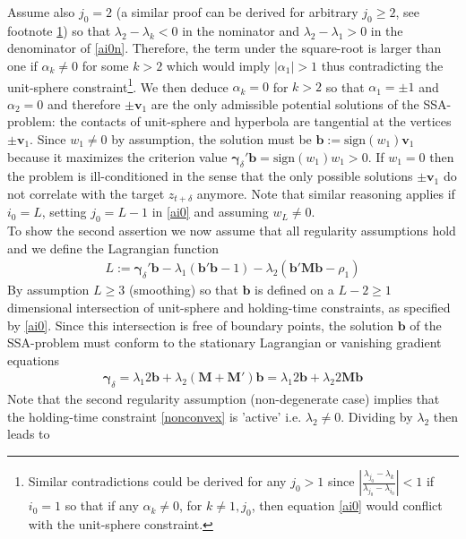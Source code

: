 \documentclass[a4paper]{article}
\begin{document}
Assume also $j_0=2$ (a similar proof can be derived for arbitrary $j_0\geq 2$, see footnote \ref{footnval})
so that $\lambda_{2}-\lambda_k<0$ in the nominator  and $\lambda_{2}-\lambda_{1}>0$ in the denominator of \ref{ai0n}. Therefore, the term under the square-root is larger than one if $\alpha_k\neq 0$ for some $k>2$ which would imply $|\alpha_{1}|>1$ thus contradicting the unit-sphere constraint\footnote{\label{footnval}Similar contradictions could be derived for any $j_0>1$ since $\left|\frac{\lambda_{j_0}-\lambda_k}{\lambda_{j_0}-\lambda_{i_0}}\right|<1$ if $i_0=1$ so that if any $\alpha_k\neq 0$, for $k\neq 1,j_0$, then equation \ref{ai0} would conflict with the unit-sphere constraint.}. We then deduce $\alpha_k=0$ for $k>2$ so that $\alpha_{1}=\pm 1$ and  $\alpha_{2}=0$ and therefore $\pm \mathbf{v}_1$ are the only admissible potential solutions of the SSA-problem: the contacts of unit-sphere and hyperbola are tangential at the vertices $\pm\mathbf{v}_1$. Since $w_1\neq 0$ by assumption, the solution must be $\mathbf{b}:=\textrm{sign}(w_1)\mathbf{v}_1$ because it maximizes the criterion value $\boldsymbol{\gamma}_{\delta}'\mathbf{b}=\textrm{sign}(w_1)w_1>0$. 
If $w_1=0$ then the problem is ill-conditioned in the sense that the only possible solutions $\pm \mathbf{v}_1$ do not correlate with the target $z_{t+\delta}$ anymore.  
Note that  similar reasoning applies if $i_0=L$, setting $j_0=L-1$ in \ref{ai0} and assuming $w_L\neq 0$.\\
To show the second assertion we now assume that all regularity assumptions hold and we define the Lagrangian function 
\begin{eqnarray}\label{lag_SSA}
L:=\boldsymbol{\gamma}_{\delta}'\mathbf{b}-\lambda_1(\mathbf{b}'\mathbf{b}-1)-\lambda_2(\mathbf{b}'\mathbf{M}\mathbf{b}-\rho_1)
\end{eqnarray}
By assumption $L\geq 3$ (smoothing) so that $\mathbf{b}$ is defined on a  $L-2\geq 1$ dimensional intersection of unit-sphere and holding-time constraints, as specified by \ref{ai0}. Since this intersection is free of boundary points, the solution $\mathbf{b}$ of the SSA-problem must conform to the stationary Lagrangian or vanishing gradient equations
\begin{eqnarray}\label{diff_lag}
\boldsymbol{\gamma}_{\delta}=\lambda_1 2\mathbf{b}+\lambda_2 (\mathbf{M}+\mathbf{M}')\mathbf{b}=\lambda_1 2\mathbf{b}+\lambda_2 2\mathbf{M}\mathbf{b}
\end{eqnarray}
Note that the second regularity assumption (non-degenerate case) implies that the holding-time constraint \ref{nonconvex} is 'active' i.e. $\lambda_2\neq 0$.  Dividing by $\lambda_2$ then leads to 
\end{document}
